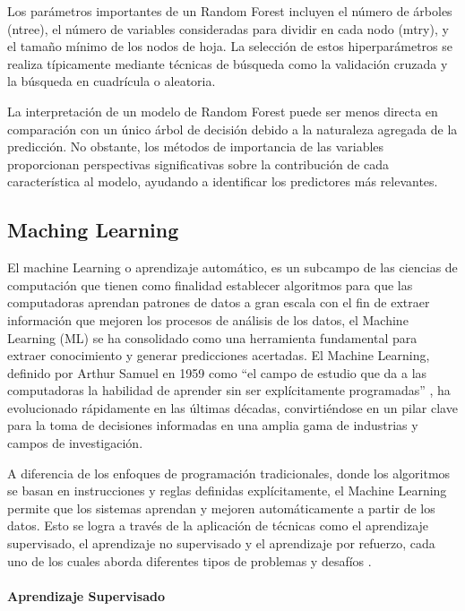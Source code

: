 \documentclass[
  11pt,
  bookmarksnumbered]{article}
\begin{document}
Los parámetros importantes de un Random Forest incluyen el número de árboles (ntree), el número de variables consideradas para dividir en cada nodo (mtry), y el tamaño mínimo de los nodos de hoja.
La selección de estos hiperparámetros se realiza típicamente mediante técnicas de búsqueda como la validación cruzada y la búsqueda en cuadrícula o aleatoria.

La interpretación de un modelo de Random Forest puede ser menos directa en comparación con un único árbol de decisión debido a la naturaleza agregada de la predicción.
No obstante, los métodos de importancia de las variables proporcionan perspectivas significativas sobre la contribución de cada característica al modelo, ayudando a identificar los predictores más relevantes.

\hypertarget{maching-learning}{%
\subsection{Maching Learning}\label{maching-learning}}

El machine Learning o aprendizaje automático, es un subcampo de las ciencias de computación que tienen como finalidad establecer algoritmos para que las computadoras aprendan patrones de datos a gran escala con el fin de extraer información que mejoren los procesos de análisis de los datos, el Machine Learning (ML) se ha consolidado como una herramienta fundamental para extraer conocimiento y generar predicciones acertadas.
El Machine Learning, definido por Arthur Samuel en 1959 como ``el campo de estudio que da a las computadoras la habilidad de aprender sin ser explícitamente programadas'' \textcite{Samuel1959}, ha evolucionado rápidamente en las últimas décadas, convirtiéndose en un pilar clave para la toma de decisiones informadas en una amplia gama de industrias y campos de investigación.

A diferencia de los enfoques de programación tradicionales, donde los algoritmos se basan en instrucciones y reglas definidas explícitamente, el Machine Learning permite que los sistemas aprendan y mejoren automáticamente a partir de los datos.
Esto se logra a través de la aplicación de técnicas como el aprendizaje supervisado, el aprendizaje no supervisado y el aprendizaje por refuerzo, cada uno de los cuales aborda diferentes tipos de problemas y desafíos \textcite{Hastie2009}.

\hypertarget{aprendizaje-supervisado}{%
\paragraph{Aprendizaje Supervisado}\label{aprendizaje-supervisado}}
\end{document}
